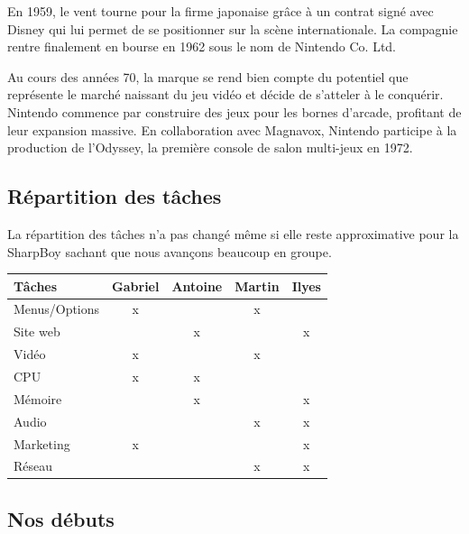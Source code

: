 \documentclass[12pt, a4paper]{article}
\begin{document}
En 1959, le vent tourne pour la firme japonaise grâce à un contrat signé avec Disney qui lui permet de se positionner sur la scène internationale. La compagnie rentre finalement en bourse en 1962 sous le nom de Nintendo Co. Ltd. 

Au cours des années 70, la marque se rend bien compte du potentiel que représente le marché naissant du jeu vidéo et décide de s'atteler à le conquérir. Nintendo commence par construire des jeux pour les bornes d'arcade, profitant de leur expansion massive. En collaboration avec Magnavox, Nintendo participe à la production de l'Odyssey, la première console de salon multi-jeux en 1972.

\pagebreak
\bigskip
\subsection{Répartition des tâches}
\bigskip

La répartition des tâches n'a pas changé même si elle reste approximative pour la SharpBoy sachant que nous avançons beaucoup en groupe.

\bigskip
\bigskip
\begin{center}
\begin{tabular}{|l|c|c|c|c|}
\hline
\bf Tâches                & \bf Gabriel   & \bf Antoine   & \bf Martin    & \bf Ilyes\\
\hline 
Menus/Options       &      x       &               &         x     &       \\
\hline 
Site web            &               &         x     &               &     x  \\
\hline 
Vidéo               &          x    &               &       x       &       \\
\hline 
CPU                 & x             & x             &               &       \\
\hline 
Mémoire             &               & x             &               &  x \\
\hline
Audio               &               &               & x             & x \\
\hline
Marketing           & x             &               &               & x \\
\hline
Réseau              &               &               & x             & x \\ 
\hline
\end{tabular}
\end{center}
\bigskip
\pagebreak

\subsection{Nos débuts}
\end{document}
